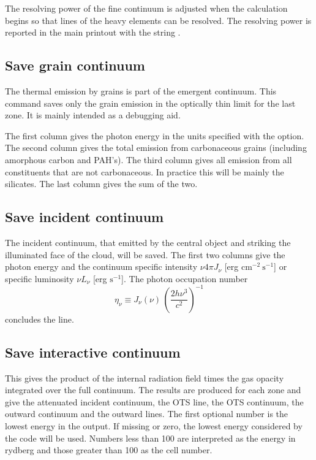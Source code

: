 The resolving power of the fine continuum is adjusted when the calculation begins so
that lines of the heavy elements can be resolved.
The resolving power is reported in the main printout with the string
.

\subsection{Save grain continuum}

The thermal emission by grains is part of the emergent continuum.  This
command saves only the grain emission in the optically thin limit for
the last zone.  It is mainly intended as a debugging aid.

The first column gives the photon energy in the units specified with
the  option.  The second column gives the total emission from
carbonaceous grains (including amorphous carbon and PAH's).  The third column
gives all emission from all constituents that are not carbonaceous.  In
practice this will be mainly the silicates.  The last column gives the sum
of the two.

\subsection{Save incident continuum}
\label{sec:CommandSaveIncidentContinuum}

The incident continuum, that emitted by the central object and striking
the illuminated face of the cloud, will be saved.  The first two columns give
the photon energy and the continuum specific intensity 
$\nu 4\pi J_{\nu}$ [erg cm$^{-2}\ \mathrm{s}^{-1}$] 
or specific luminosity 
$\nu L_{\nu}$ [erg  $\mathrm{s}^{-1}$].
The photon occupation number 
\begin{equation}
{\eta _\nu } \equiv {J_\nu }\left( \nu  \right)\,{\left( {\frac{{2h{\nu
^3}}}{{{c^2}}}} \right)^{ - 1}}
\end{equation}
concludes the line.

\subsection{Save interactive continuum}

This gives the product of the internal radiation field times the gas opacity integrated over the full continuum.  
The results are produced for each zone and give
the attenuated incident continuum, the OTS line, the OTS continuum, the
outward continuum and the outward lines.  The first optional number is the
lowest energy in the output.  If missing or zero, the lowest energy
considered by the code will be used.  Numbers less than 100 are interpreted
as the energy in rydberg and those greater than 100 as the cell number.

